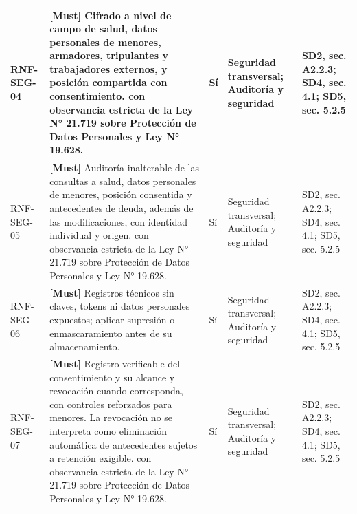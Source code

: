 \begin{paginaHorizontalSynaptix}
\begin{longtable}{|L{0.09\AnchoMatrizTDoce}|L{0.385\AnchoMatrizTDoce}|L{0.065\AnchoMatrizTDoce}|L{0.18\AnchoMatrizTDoce}|L{0.28\AnchoMatrizTDoce}|}
RNF-\allowbreak{}SEG-\allowbreak{}04 &
\textbf{[Must]} Cifrado a nivel de campo de salud, datos personales de menores, armadores, tripulantes y trabajadores externos, y posición compartida con consentimiento. con observancia estricta de la Ley N° 21.719 sobre Protección de Datos Personales y Ley N° 19.628. &
Sí &
Seguridad transversal; Auditoría y seguridad &
SD2, sec. A2.2.3; SD4, sec. 4.1; SD5, sec. 5.2.5 \\ \hline

RNF-\allowbreak{}SEG-\allowbreak{}05 &
\textbf{[Must]} Auditoría inalterable de las consultas a salud, datos personales de menores, posición consentida y antecedentes de deuda, además de las modificaciones, con identidad individual y origen. con observancia estricta de la Ley N° 21.719 sobre Protección de Datos Personales y Ley N° 19.628. &
Sí &
Seguridad transversal; Auditoría y seguridad &
SD2, sec. A2.2.3; SD4, sec. 4.1; SD5, sec. 5.2.5 \\ \hline

RNF-\allowbreak{}SEG-\allowbreak{}06 &
\textbf{[Must]} Registros técnicos sin claves, tokens ni datos personales expuestos; aplicar supresión o enmascaramiento antes de su almacenamiento. &
Sí &
Seguridad transversal; Auditoría y seguridad &
SD2, sec. A2.2.3; SD4, sec. 4.1; SD5, sec. 5.2.5 \\ \hline

RNF-\allowbreak{}SEG-\allowbreak{}07 &
\textbf{[Must]} Registro verificable del consentimiento y su alcance y revocación cuando corresponda, con controles reforzados para menores. La revocación no se interpreta como eliminación automática de antecedentes sujetos a retención exigible. con observancia estricta de la Ley N° 21.719 sobre Protección de Datos Personales y Ley N° 19.628. &
Sí &
Seguridad transversal; Auditoría y seguridad &
SD2, sec. A2.2.3; SD4, sec. 4.1; SD5, sec. 5.2.5 \\ \hline
\end{longtable}



\end{paginaHorizontalSynaptix}
